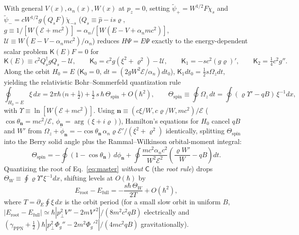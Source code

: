 \documentclass[aps,prd,onecolumn,tightenlines,nofootinbib,notitlepage,10pt,floatfix]{revtex4-2}
\theoremstyle{indentedtheorem}
\begin{document}
With general $V(x),\alpha_n(x),W(x)$ at $p_z=0$, setting $\tilde{\psi}_+=W^{1/2}F\check{\chi}_s$ and $\tilde{\psi}_-=cW^{1/2}g(Q_s F)\check{\chi}_{-s}$ ($Q_s\equiv\hat{p}-is\varrho$, $g\equiv 1/[W(\mathcal{E}+mc^2)]=\alpha_n/[W(E-V+\alpha_n mc^2)]$, $\mathcal{U}\equiv W(E-V-\alpha_n mc^2)/\alpha_n$) reduces $H\Psi=E\Psi$ exactly to the energy-dependent scalar problem $\mathsf{K}(E)F=0$ for
\begin{equation}
    \mathsf{K}(E) \equiv c^2 Q_s^\dagger g Q_s - \mathcal{U} , \qquad \mathsf{K}_0 = c^2 g(\xi^2+\varrho^2)-\mathcal{U} , \qquad \mathsf{K}_1 = -sc^2(g\varrho)' , \qquad \mathsf{K}_2 = \tfrac{1}{4}c^2 g'' .
    \label{eq:K_operator}
\end{equation}
Along the orbit $H_0=E$ ($\mathsf{K}_0=0$, $dt=(2gW^2\mathcal{E}/\alpha_n)dt_0$), $\mathsf{K}_1 dt_0=\tfrac{1}{2}s\Omega_z dt$, yielding the relativistic Bohr--Sommerfeld quantization rule~\citep{Keppeler2003Semiclassical,CarmierUllmo2008Berry,Fuchs2010Topological,IfaLouatiRouleux2017Bohr,BeckerFujiieWittsten2025Bohr}
\begin{equation}
    \oint_{H_0=E}\xi\,dx = 2\pi\hbar\,\big(n+\tfrac{1}{2}\big) + \tfrac{1}{2}\,s\,\hbar\,\Theta_\text{spin} + O(\hbar^2) , \qquad \Theta_\text{spin} \equiv \oint\Omega_z\,dt = \oint(\varrho\Upsilon'-qB)\,\xi^{-1}dx ,
    \label{eq:rule_spin_angle}
\end{equation}
with $\Upsilon\equiv\ln[W(\mathcal{E}+mc^2)]$. Using $\mathbf{n}\equiv(c\xi/W,c\varrho/W,mc^2)/\mathcal{E}$ ($\cos\theta_\mathbf{n}=mc^2/\mathcal{E}$, $\phi_\mathbf{n}=\arg(\xi+i\varrho)$), Hamilton's equations for $H_0$ cancel $qB$ and $W'$ from $\Omega_z+\dot{\phi}_\mathbf{n}=-\cos\theta_\mathbf{n}\,\alpha_n\varrho\mathcal{E}'/(\xi^2+\varrho^2)$ identically, splitting $\Theta_\text{spin}$ into the Berry solid angle plus the Rammal--Wilkinson orbital-moment integral:
\begin{equation}
    \Theta_\text{spin} = -\oint(1-\cos\theta_\mathbf{n})\,d\phi_\mathbf{n} + \oint\frac{mc^2\alpha_n c^2}{W^2\mathcal{E}^2}\!\left(\frac{\varrho W'}{W}-qB\right)dt .
    \label{eq:spin_angle_geom}
\end{equation}
Quantizing the root of Eq.~\eqref{eq:master} \emph{without} $\mathsf{C}$ (the \emph{root rule}) drops $\Theta_W\equiv\oint\varrho\Upsilon'\xi^{-1}dx$, shifting levels at $O(\hbar)$ by
\begin{equation}
    E_\text{root} - E_\text{full} = -\frac{s\hbar\,\Theta_W}{2T} + O(\hbar^2) ,
    \label{eq:root_shift}
\end{equation}
where $T=\partial_E\oint\xi\,dx$ is the orbit period (for a small slow orbit in uniform $B$, $|E_\text{root}-E_\text{full}|\simeq\hbar|p_\perp^2 V''-2mV'^2|/(8m^2 c^2 qB)$ electrically and $(\gamma_\text{PPN}+\tfrac{1}{2})\hbar|p_\perp^2\Phi_g''-2m^2\Phi_g'^2|/(4mc^2 qB)$ gravitationally).
\end{document}
